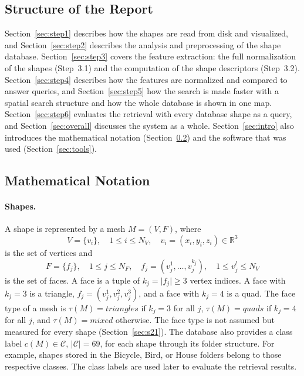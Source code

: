\documentclass[10pt,a4paper]{article}
\newcommand{\R}{\mathbb{R}}
\newcommand{\card}[1]{\lvert #1\rvert}
\begin{document}
\subsection{Structure of the Report}
Section~\ref{sec:step1} describes how the shapes are read from disk and visualized, and Section~\ref{sec:step2} describes
the analysis and preprocessing of the shape database. Section~\ref{sec:step3} covers the feature extraction: the full normalization of the shapes
(Step~3.1) and the computation of the shape descriptors (Step~3.2). Section~\ref{sec:step4} describes how the features are
normalized and compared to answer queries, and Section~\ref{sec:step5} how the search is made faster with a spatial search
structure and how the whole database is shown in one map. Section~\ref{sec:step6} evaluates the retrieval with every database
shape as a query, and Section~\ref{sec:overall} discusses the system as a whole. Section~\ref{sec:intro} also introduces the
mathematical notation (Section~\ref{sec:notation}) and the software that was used (Section~\ref{sec:tools}).

\subsection{Mathematical Notation}\label{sec:notation}

\paragraph{Shapes.}
A shape is represented by a mesh $M=(V,F)$, where
\begin{equation}
  V=\{v_i\},\quad 1\le i\le N_V,\quad v_i=(x_i,y_i,z_i)\in\R^3
  \label{eq:vertices}
\end{equation}
is the set of vertices and
\begin{equation}
  F=\{f_j\},\quad 1\le j\le N_F,\quad f_j=(v_j^1,\dots,v_j^{k_j}),\quad 1\le v_j^l\le N_V
  \label{eq:faces}
\end{equation}
is the set of faces. A face is a tuple of $k_j=\card{f_j}\ge 3$ vertex indices. A face with $k_j=3$ is a triangle,
$f_j=(v_j^1,v_j^2,v_j^3)$, and a face with $k_j=4$ is a quad. The face type of a mesh is
$\tau(M)=\textit{triangles}$ if $k_j=3$ for all $j$, $\tau(M)=\textit{quads}$ if $k_j=4$ for all $j$, and
$\tau(M)=\textit{mixed}$ otherwise. The face type is not assumed but measured for every shape (Section~\ref{sec:s21}).
The database also provides a class label $c(M)\in\mathcal{C}$, $\card{\mathcal{C}}=69$, for each shape through its folder
structure. For example, shapes stored in the Bicycle, Bird, or House folders belong to those respective classes. The class labels are
used later to evaluate the retrieval results.
\end{document}

